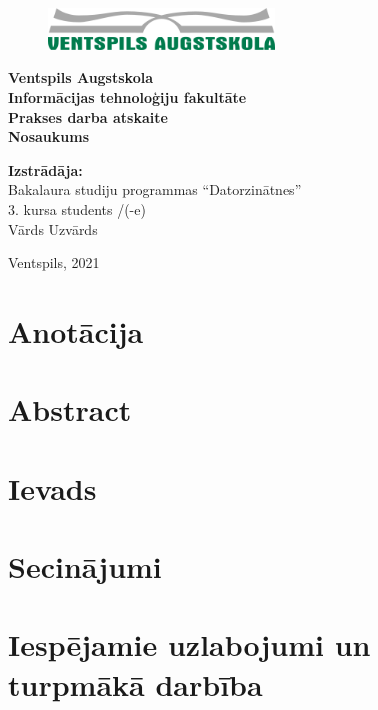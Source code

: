 \documentclass[12pt,a4paper,oneside]{article}
\begin{document}
\begin{titlepage}
    \begin{center}
        \begin{figure}[ht]
            \centering
            \includegraphics[width=60mm]{pics/vea_logo.png}
        \end{figure}
        \large
        \textbf{Ventspils Augstskola \\Informācijas tehnoloģiju fakultāte}
        \vspace*{4cm}
        \\
        \textbf{Prakses darba atskaite} \\
        \LARGE
        \textbf{Nosaukums}
        \vspace{0.5cm}
        \large
        \\
    \end{center}

    \vspace{2cm}

    \begin{flushright}
        \normalsize
        \textbf{Izstrādāja:}\\
        Bakalaura studiju programmas “Datorzinātnes”\\
        3. kursa students /(-e)\\
        Vārds Uzvārds \\
    \end{flushright}

    \vfill

    \begin{center}
        \Large
        Ventspils, 2021
    \end{center}

\end{titlepage}

\newpage
\section*{\centering Anotācija}


\newpage
\section*{\centering Abstract}


\clearpage
\tableofcontents
\clearpage

\newpage
\section{Ievads}


\newpage
\section{Secinājumi}


\newpage
\section{Iespējamie uzlabojumi un turpmākā darbība}


\newpage
\printbibliography
\end{document}
